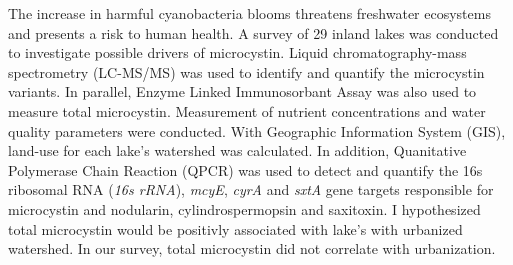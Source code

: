 The increase in harmful cyanobacteria blooms threatens freshwater ecosystems and presents a risk to human health.  A survey of 29 inland lakes was conducted to investigate possible drivers of microcystin. Liquid chromatography-mass spectrometry (LC-MS/MS) was used to identify and quantify the microcystin variants. In parallel, Enzyme Linked Immunosorbant Assay was also used to measure total microcystin. Measurement of nutrient concentrations and water quality parameters were conducted. With Geographic Information System (GIS), land-use for each lake's watershed was calculated. In addition, Quanitative Polymerase Chain Reaction (QPCR) was used to detect and quantify the 16s ribosomal RNA (\emph{16s rRNA}), \emph{mcyE}, \emph{cyrA} and \emph{sxtA} gene targets responsible for microcystin and nodularin, cylindrospermopsin and saxitoxin. I hypothesized total microcystin would be positivly associated with lake's with urbanized watershed. In our survey, total microcystin did not correlate with urbanization. 
